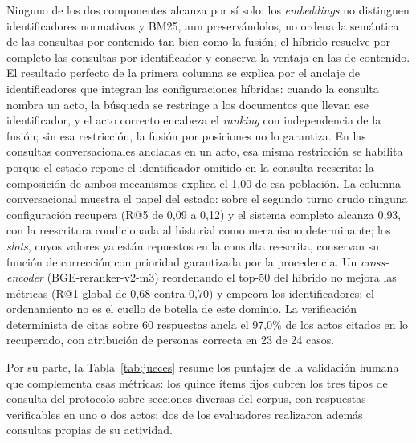 \documentclass{llncs}
\begin{document}
Ninguno de los dos componentes alcanza por sí solo: los \emph{embeddings} no
distinguen identificadores normativos y BM25, aun preservándolos, no ordena la
semántica de las consultas por contenido tan bien como la fusión; el
híbrido resuelve por completo las consultas por identificador y conserva la
ventaja en las de contenido. El resultado perfecto de la primera columna se
explica por el anclaje de identificadores que integran las configuraciones
híbridas: cuando la consulta nombra un acto, la búsqueda se restringe a los
documentos que llevan ese identificador, y el acto correcto encabeza el
\emph{ranking} con independencia de la fusión; sin esa restricción, la
fusión por posiciones no lo garantiza. En las consultas conversacionales
ancladas en un acto, esa misma restricción se habilita porque el estado repone
el identificador omitido en la consulta reescrita: la composición de ambos
mecanismos explica el 1{,}00 de esa población. La columna conversacional muestra el papel del
estado: sobre el segundo turno crudo ninguna configuración recupera (R@5 de
0{,}09 a 0{,}12) y el sistema completo alcanza 0{,}93, con la reescritura
condicionada al historial como mecanismo determinante; los \emph{slots}, cuyos
valores ya están repuestos en la consulta reescrita, conservan su función de
corrección con prioridad garantizada por la procedencia. Un \emph{cross-encoder}
(BGE-reranker-v2-m3) reordenando el top-50 del híbrido no mejora las
métricas (R@1 global de 0{,}68 contra 0{,}70) y empeora los identificadores:
el ordenamiento no es el cuello de botella de este dominio. La
verificación determinista de citas sobre 60 respuestas ancla el 97{,}0\% de
los actos citados en lo recuperado, con atribución de personas correcta en 23
de 24 casos.

Por su parte, la Tabla~\ref{tab:jueces} resume los puntajes de la validación
humana que complementa esas métricas: los quince ítems fijos cubren los tres tipos de
consulta del protocolo sobre secciones diversas del corpus, con respuestas
verificables en uno o dos actos; dos de los evaluadores realizaron además
consultas propias de su actividad.\nopagebreak
\end{document}
